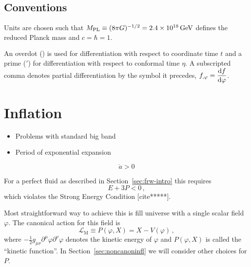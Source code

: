 \subsection{Conventions}
\label{sec:conventions}
Units are chosen such that $M_{\mathrm{PL}} \equiv (8\pi G )^{-1/2}= 2 
.4 \times 10^{18}\, {\rm GeV}$ 
defines the reduced Planck mass and $c=\hbar =1$. 

An overdot ($\dot{}$) is used for differentiation with respect to coordinate
time $t$ and a prime ($'$) for differentiation with respect to conformal time
$\eta$. A subscripted comma denotes partial differentiation by the symbol it
precedes, \eg $f_{,\varphi} = \dfrac{\mathrm{d} f}{\mathrm{d} \varphi}$.

\section{Inflation}
\label{sec:inflation-intro}
\begin{itemize}
 \item Problems with standard big band
 \item Period of exponential expansion
\end{itemize}
\begin{equation}
 \label{eq:addot-intro}
 \ddot{a} > 0
\end{equation}

For a perfect fluid as described in Section~\ref{sec:frw-intro} this requires
% 
\begin{equation}
 E + 3P <0\,,
\end{equation}
% 
which violates the Strong Energy Condition [cite*****].

Most straightforward way to achieve this is fill universe with a single scalar
field $\varphi$. The canonical action for this field is
\begin{equation}
 \mathcal{L}_\mathrm{M} \equiv P(\varphi, X) = X -V(\varphi) \,,
\end{equation}
where $-\frac{1}{2}g_{\mu\nu}\partial^\mu\varphi \partial^\nu\varphi$ denotes
the kinetic energy of $\varphi$ and $P(\varphi, X)$ is called the ``kinetic
function''. In Section~\ref{sec:noncanoninfl} we will consider other
choices for $P$. 

